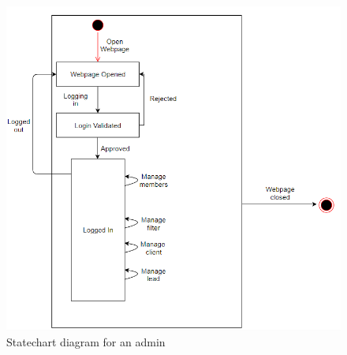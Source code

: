\begin{figure}[H]
    \centering
    \includegraphics[scale=.7, clip]{figures/useCaseAdmin.png}
    \caption{Statechart diagram for an admin}
    \label{fig:useCaseAdmin}
\end{figure}

